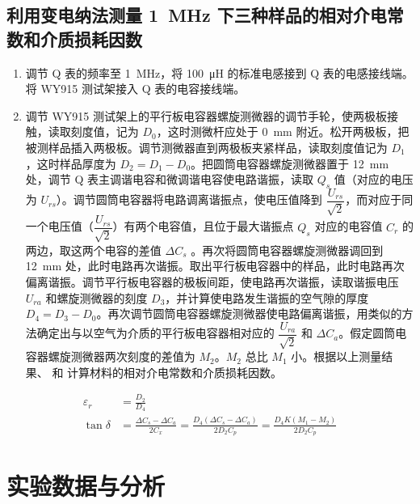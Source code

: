 \documentclass[a4paper,utf8]{article}
\begin{document}
    \subsection{利用变电纳法测量 \SI{1}{\mega\hertz} 下三种样品的相对介电常数和介质损耗因数}
        \begin{enumerate}
            \item 调节 Q 表的频率至 \SI{1}{\mega\hertz}，将 \SI{100}{\micro\henry} 的标准电感接到 Q 表的电感接线端。将 WY915 测试架接入 Q 表的电容接线端。
            \item 调节 WY915 测试架上的平行板电容器螺旋测微器的调节手轮，使两极板接触，读取刻度值，记为 $D_0$，这时测微杆应处于 \SI{0}{\milli\metre} 附近。松开两极板，把被测样品插入两极板。调节测微器直到两极板夹紧样品，读取刻度值记为 $D_1$，这时样品厚度为 $D_2 = D_1 - D_0$。把圆筒电容器螺旋测微器置于 \SI{12}{\milli\metre} 处，调节 Q 表主调谐电容和微调谐电容使电路谐振，读取 $Q_s$ 值（对应的电压为 $U_{rs}$）。调节圆筒电容器将电路调离谐振点，使电压值降到 $\dfrac{U_{rs}}{\sqrt{2}}$，而对应于同一个电压值（$\dfrac{U_{rs}}{\sqrt{2}}$）有两个电容值，且位于最大谐振点 $Q_s$ 对应的电容值 $C_r$ 的两边，取这两个电容的差值 $\varDelta C_s$ 。再次将圆筒电容器螺旋测微器调回到 \SI{12}{\milli\metre} 处，此时电路再次谐振。取出平行板电容器中的样品，此时电路再次偏离谐振。调节平行板电容器的极板间距，使电路再次谐振，读取谐振电压 $U_{ra}$ 和螺旋测微器的刻度 $D_3$，并计算使电路发生谐振的空气隙的厚度 $D_4=D_3-D_0$。再次调节圆筒电容器螺旋测微器使电路偏离谐振，用类似的方法确定出与以空气为介质的平行板电容器相对应的 $\dfrac{U_{ra}}{\sqrt{2}}$ 和 $\varDelta C_a$。假定圆筒电容器螺旋测微器两次刻度的差值为 $M_2$。$M_2$ 总比 $M_1$ 小。根据以上测量结果、 和 计算材料的相对介电常数和介质损耗因数。
        \end{enumerate}
        \begin{align}
            \varepsilon_r&=\frac{D_2}{D_4}\label{eq23}\\
            \tan\delta&=\frac{\Delta C_{s}-\Delta C_{a}}{2C_{x}}=\frac{D_{4}(\Delta C_{s}-\Delta C_{a})}{2D_{2}C_{p}}=\frac{D_{4}K(M_{1}-M_{2})}{2D_{2}C_{p}}\label{eq24}
        \end{align}
\section{实验数据与分析}
\end{document}
